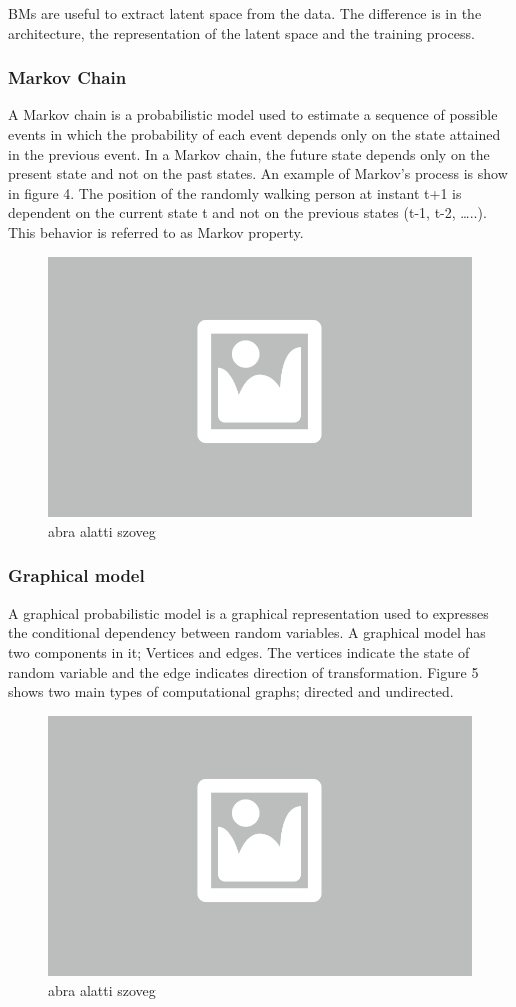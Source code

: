 BMs are useful to extract latent space from the data. The difference is in the architecture, the representation of the latent space and the training process. 

\subsubsection{Markov Chain}

A Markov chain is a probabilistic model used to estimate a sequence of possible events in which the probability of each event depends only on the state attained in the previous event.  In a Markov chain, the future state depends only on the present state and not on the past states. An example of Markov’s process is show in figure 4.  The position of the randomly walking person at instant t+1 is dependent on the current state t and not on the previous states (t-1, t-2, …..). This behavior is referred to as Markov property.

\begin{figure}[ht]
	\centering
	\includegraphics[width=0.65\columnwidth]{figures/abra.png}
	\caption{abra alatti szoveg}
\end{figure}


\subsubsection{Graphical model}

A graphical probabilistic model is a graphical representation used to expresses the conditional dependency between random variables. A graphical model has two components in it; Vertices and edges. The vertices indicate the state of random variable and the edge indicates direction of transformation. Figure 5 shows two main types of computational graphs; directed and undirected.

\begin{figure}[ht]
	\centering
	\includegraphics[width=0.65\columnwidth]{figures/abra.png}
	\caption{abra alatti szoveg}
\end{figure}

